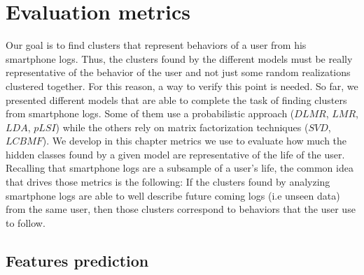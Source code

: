 
\chapter{Evaluation metrics} %

\label{Chapter5} %

Our goal is to find clusters that represent behaviors of a user from his smartphone logs. Thus, the clusters found by the different models must be really representative of the behavior of the user and not just some random realizations clustered together. For this reason, a way to verify this point is needed. So far, we presented different models that are able to complete the task of finding clusters from smartphone logs. Some of them use a probabilistic approach ($DLMR$, $LMR$, $LDA$, $pLSI$) while the others rely on matrix factorization techniques ($SVD$, $LCBMF$). We develop in this chapter metrics we use to evaluate how much the hidden classes found by a given model are representative of the life of the user. Recalling that smartphone logs are a subsample of a user's life, the common idea that drives those metrics is the following: If the clusters found by analyzing smartphone logs are able to well describe future coming logs (i.e unseen data) from the same user, then those clusters correspond to behaviors that the user use to follow.

\section{Features prediction}


